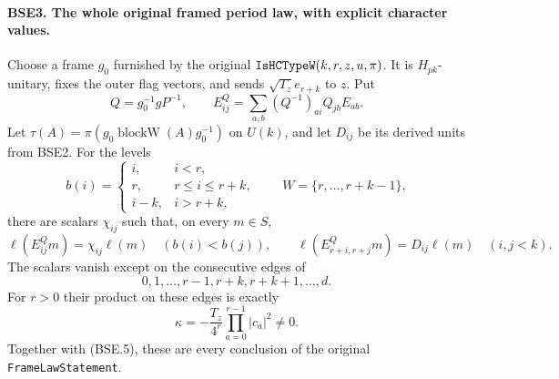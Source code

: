 \documentclass[11pt,a4paper]{article}
\numberwithin{equation}{section}
\theoremstyle{remark}\newtheorem{remark}[theorem]{Remark}
\begin{document}
\paragraph{BSE3. The whole original framed period law, with explicit character values.}
\label{claim:BSE3}
Choose a frame $g_0$ furnished by the original
$\texttt{Is\allowbreak HCType\allowbreak W}(k,r,z,u,\pi)$.
It is $H_{pk}$-unitary, fixes the outer flag vectors, and sends
$\sqrt{T_z}e_{r+k}$ to $z$.  Put
\[
 Q=g_0^{-1}gP^{-1},\qquad
 E^Q_{ij}=\sum_{a,b}(Q^{-1})_{ai}Q_{jb}E_{ab}.
 \tag{BSE.6}
\]
Let $\tau(A)=\pi(g_0\operatorname{blockW}(A)g_0^{-1})$ on
$U(k)$, and let $D_{ij}$ be its derived units from BSE2.
For the levels
\[
 b(i)=
 \begin{cases}
 i,&i<r,\\
 r,&r\le i\le r+k,\\
 i-k,&i>r+k,
 \end{cases}
 \qquad W=\{r,\ldots,r+k-1\},
 \tag{BSE.7}
\]
there are scalars $\chi_{ij}$ such that, on every $m\in S$,
\[
 \ell(E^Q_{ij}m)=\chi_{ij}\ell(m)\quad(b(i)<b(j)),\qquad
 \ell(E^Q_{r+i,r+j}m)=D_{ij}\ell(m)\quad(i,j<k).
 \tag{BSE.8}
\]
The scalars vanish except on the consecutive edges of
\[
                   0,1,\ldots,r-1,r+k,r+k+1,\ldots,d.
 \tag{BSE.9}
\]
For $r>0$ their product on these edges is exactly
\[
              \kappa=-\frac{T_z}{4^r}
                               \prod_{a=0}^{r-1}|c_a|^2\ne0.
 \tag{BSE.10}
\]
Together with (BSE.5), these are every conclusion of the original
\texttt{Frame\allowbreak Law\allowbreak Statement}.
\end{document}
